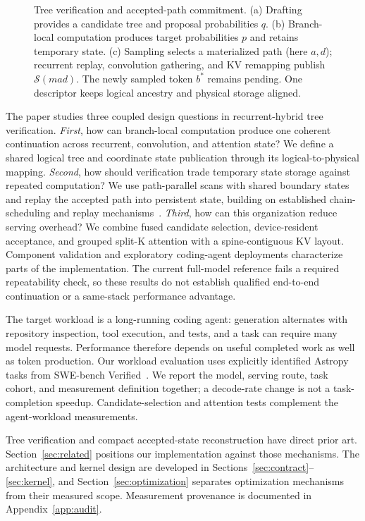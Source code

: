 \documentclass[conference]{IEEEtran}
\begin{document}
\begin{figure}[t]
\centering
\resizebox{\textwidth}{!}{}
\caption{Tree verification and accepted-path commitment. (a) Drafting provides a candidate tree and proposal probabilities $q$. (b) Branch-local computation produces target probabilities $p$ and retains temporary state. (c) Sampling selects a materialized path (here $a,d$); recurrent replay, convolution gathering, and KV remapping publish $\mathcal{S}(mad)$. The newly sampled token $b^*$ remains pending. One descriptor keeps logical ancestry and physical storage aligned.}
\label{fig:pipeline}
\end{figure}

The paper studies three coupled design questions in recurrent-hybrid tree verification. \textit{First}, how can branch-local computation produce one coherent continuation across recurrent, convolution, and attention state? We define a shared logical tree and coordinate state publication through its logical-to-physical mapping. \textit{Second}, how should verification trade temporary state storage against repeated computation? We use path-parallel scans with shared boundary states and replay the accepted path into persistent state, building on established chain-scheduling and replay mechanisms~\cite{wang2026specla,oda2026marginals}. \textit{Third}, how can this organization reduce serving overhead? We combine fused candidate selection, device-resident acceptance, and grouped split-K attention with a spine-contiguous KV layout. Component validation and exploratory coding-agent deployments characterize parts of the implementation. The current full-model reference fails a required repeatability check, so these results do not establish qualified end-to-end continuation or a same-stack performance advantage.

The target workload is a long-running coding agent: generation alternates with repository inspection, tool execution, and tests, and a task can require many model requests. Performance therefore depends on useful completed work as well as token production. Our workload evaluation uses explicitly identified Astropy tasks from SWE-bench Verified~\cite{jimenez2024swe}. We report the model, serving route, task cohort, and measurement definition together; a decode-rate change is not a task-completion speedup. Candidate-selection and attention tests complement the agent-workload measurements.

Tree verification and compact accepted-state reconstruction have direct prior art. Section~\ref{sec:related} positions our implementation against those mechanisms. The architecture and kernel design are developed in Sections~\ref{sec:contract}--\ref{sec:kernel}, and Section~\ref{sec:optimization} separates optimization mechanisms from their measured scope. Measurement provenance is documented in Appendix~\ref{app:audit}.
\end{document}
